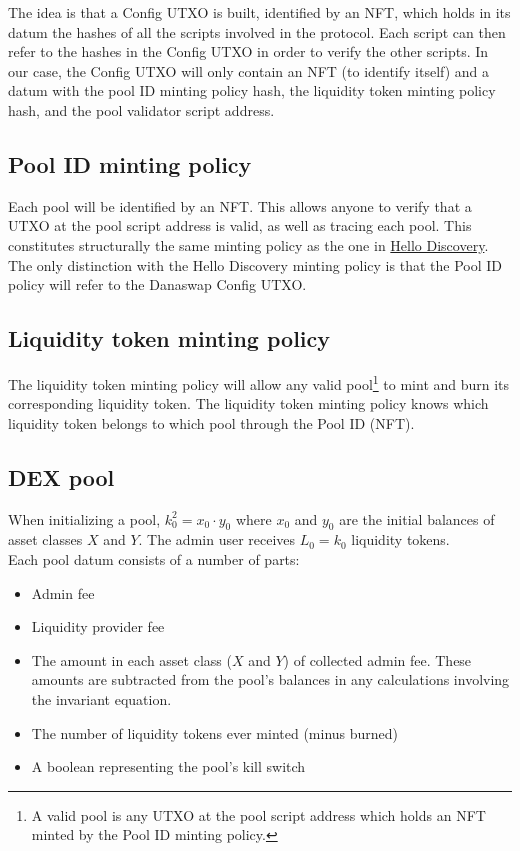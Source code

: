\documentclass{article}
\begin{document}
The idea is that a Config UTXO is built, identified by an NFT, which holds in
its datum the hashes of all the scripts involved in the protocol. Each script
can then refer to the hashes in the Config UTXO in order to verify the other
scripts. In our case, the Config UTXO will only contain an NFT (to identify
itself) and a datum with the pool ID minting policy hash, the liquidity token
minting policy hash, and the pool validator script address.

\subsection{Pool ID minting policy}

Each pool will be identified by an NFT. This allows anyone to verify that a UTXO
at the pool script address is valid, as well as tracing each pool. This
constitutes structurally the same minting policy as the one in
\href{https://github.com/ArdanaLabs/cardano-app-template/blob/master/onchain/src/HelloDiscovery.hs}{
  Hello Discovery}.
The only distinction with the Hello Discovery minting policy is that the Pool ID
policy will refer to the Danaswap Config UTXO.

\subsection{Liquidity token minting policy}

The liquidity token minting policy will allow any valid pool\footnote{
  A valid pool is any UTXO at the pool script address which holds an NFT minted
  by the Pool ID minting policy.
} to mint and burn its corresponding liquidity token. The liquidity token
minting policy knows which liquidity token belongs to which pool through the
Pool ID (NFT).

\subsection{DEX pool}

When initializing a pool, $k_0^2 = x_0 \cdot y_0$ where $x_0$ and $y_0$ are the
initial balances of asset classes $X$ and $Y$. The admin user receives $L_0 =
k_0$ liquidity tokens. \\

Each pool datum consists of a number of parts:
\begin{itemize}
  \item Admin fee
  \item Liquidity provider fee
  \item The amount in each asset class ($X$ and $Y$) of collected admin fee.
    These amounts are subtracted from the pool's balances in any calculations
    involving the invariant equation.
  \item The number of liquidity tokens ever minted (minus burned)
  \item A boolean representing the pool's kill switch
\end{itemize}
\end{document}

